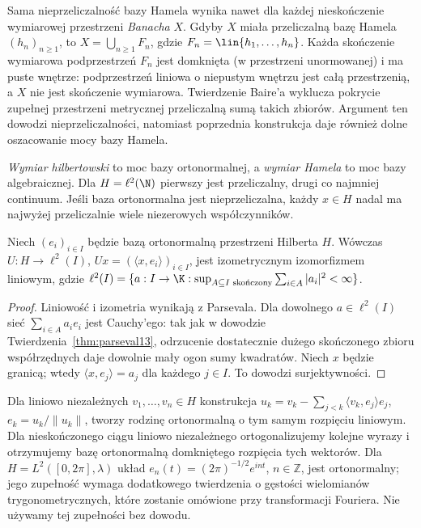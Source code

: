 \begin{uwaga}
\label{rem:hilbert-hamel-baire13}
Sama nieprzeliczalność bazy Hamela wynika nawet dla każdej
nieskończenie wymiarowej przestrzeni \emph{Banacha} $X$.
Gdyby $X$ miała przeliczalną bazę Hamela $(h_n)_{n\ge1}$,
to $X=\bigcup_{n\ge1}F_n$, gdzie
$F_n=\lin\{h_1,\ldots,h_n\}$. Każda skończenie wymiarowa
podprzestrzeń $F_n$ jest domknięta (w przestrzeni unormowanej)
i ma puste wnętrze: podprzestrzeń liniowa o niepustym wnętrzu
jest całą przestrzenią, a $X$ nie jest skończenie wymiarowa.
Twierdzenie Baire'a wyklucza pokrycie zupełnej przestrzeni
metrycznej przeliczalną sumą takich zbiorów.
Argument ten dowodzi nieprzeliczalności, natomiast poprzednia
konstrukcja daje również dolne oszacowanie mocy bazy Hamela.
\end{uwaga}

\begin{uwaga}
\label{rem:hamel-vs-hilbert13}
\emph{Wymiar hilbertowski} to moc bazy ortonormalnej,
a \emph{wymiar Hamela} to moc bazy algebraicznej.
Dla $H=\ell^2(\N)$ pierwszy jest przeliczalny, drugi
co najmniej continuum. Jeśli baza ortonormalna jest
nieprzeliczalna, każdy $x\in H$ nadal ma najwyżej
przeliczalnie wiele niezerowych współczynników.
\end{uwaga}

\begin{stwierdzenie}
\label{prop:hilbert-l2I13}
Niech $(e_i)_{i\in I}$ będzie bazą ortonormalną przestrzeni
Hilberta $H$. Wówczas $U:H\to\ell^2(I)$,
$Ux=(\langle x,e_i\rangle)_{i\in I}$, jest izometrycznym
izomorfizmem liniowym, gdzie
$\ell^2(I)=\{a:I\to\K:\sup_{A\subseteq I\text{ skończony}}
\sum_{i\in A}|a_i|^2<\infty\}$.
\end{stwierdzenie}
\begin{proof}
Liniowość i izometria wynikają z Parsevala. Dla dowolnego
$a\in\ell^2(I)$ sieć $\sum_{i\in A}a_ie_i$ jest Cauchy'ego:
tak jak w dowodzie Twierdzenia~\ref{thm:parseval13},
odrzucenie dostatecznie dużego skończonego zbioru współrzędnych
daje dowolnie mały ogon sumy kwadratów. Niech $x$ będzie granicą;
wtedy $\langle x,e_j\rangle=a_j$ dla każdego $j\in I$.
To dowodzi surjektywności.
\end{proof}

\begin{przyklad}
\label{ex:gram-schmidt13}
Dla liniowo niezależnych $v_1,\ldots,v_n\in H$ konstrukcja
$u_k=v_k-\sum_{j<k}\langle v_k,e_j\rangle e_j$,
$e_k=u_k/\|u_k\|$, tworzy rodzinę ortonormalną o tym samym
rozpięciu liniowym. Dla nieskończonego ciągu liniowo niezależnego
ortogonalizujemy kolejne wyrazy i otrzymujemy bazę ortonormalną domkniętego rozpięcia tych wektorów. Dla $H=L^2([0,2\pi],\lambda)$
układ $e_n(t)=(2\pi)^{-1/2}e^{int}$, $n\in\mathbb Z$, jest
ortonormalny; jego zupełność wymaga dodatkowego twierdzenia
o gęstości wielomianów trygonometrycznych, które zostanie
omówione przy transformacji Fouriera. Nie używamy tej zupełności
bez dowodu.
\end{przyklad}

